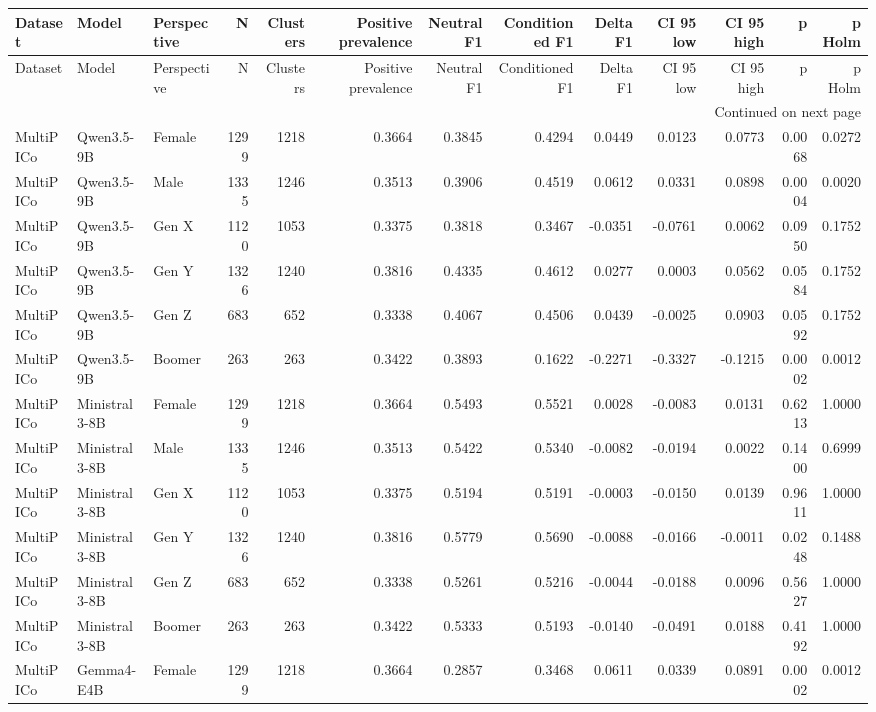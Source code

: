 \begin{longtable}{lllrrrrrrrrrr}
\toprule
Dataset & Model & Perspective & N & Clusters & Positive prevalence & Neutral F1 & Conditioned F1 & Delta F1 & CI 95 low & CI 95 high & p & p Holm \\
\midrule
\endfirsthead
\toprule
Dataset & Model & Perspective & N & Clusters & Positive prevalence & Neutral F1 & Conditioned F1 & Delta F1 & CI 95 low & CI 95 high & p & p Holm \\
\midrule
\endhead
\midrule
\multicolumn{13}{r}{Continued on next page} \\
\midrule
\endfoot
\bottomrule
\endlastfoot
MultiPICo & Qwen3.5-9B & Female & 1299 & 1218 & 0.3664 & 0.3845 & 0.4294 & 0.0449 & 0.0123 & 0.0773 & 0.0068 & 0.0272 \\
MultiPICo & Qwen3.5-9B & Male & 1335 & 1246 & 0.3513 & 0.3906 & 0.4519 & 0.0612 & 0.0331 & 0.0898 & 0.0004 & 0.0020 \\
MultiPICo & Qwen3.5-9B & Gen X & 1120 & 1053 & 0.3375 & 0.3818 & 0.3467 & -0.0351 & -0.0761 & 0.0062 & 0.0950 & 0.1752 \\
MultiPICo & Qwen3.5-9B & Gen Y & 1326 & 1240 & 0.3816 & 0.4335 & 0.4612 & 0.0277 & 0.0003 & 0.0562 & 0.0584 & 0.1752 \\
MultiPICo & Qwen3.5-9B & Gen Z & 683 & 652 & 0.3338 & 0.4067 & 0.4506 & 0.0439 & -0.0025 & 0.0903 & 0.0592 & 0.1752 \\
MultiPICo & Qwen3.5-9B & Boomer & 263 & 263 & 0.3422 & 0.3893 & 0.1622 & -0.2271 & -0.3327 & -0.1215 & 0.0002 & 0.0012 \\
MultiPICo & Ministral3-8B & Female & 1299 & 1218 & 0.3664 & 0.5493 & 0.5521 & 0.0028 & -0.0083 & 0.0131 & 0.6213 & 1.0000 \\
MultiPICo & Ministral3-8B & Male & 1335 & 1246 & 0.3513 & 0.5422 & 0.5340 & -0.0082 & -0.0194 & 0.0022 & 0.1400 & 0.6999 \\
MultiPICo & Ministral3-8B & Gen X & 1120 & 1053 & 0.3375 & 0.5194 & 0.5191 & -0.0003 & -0.0150 & 0.0139 & 0.9611 & 1.0000 \\
MultiPICo & Ministral3-8B & Gen Y & 1326 & 1240 & 0.3816 & 0.5779 & 0.5690 & -0.0088 & -0.0166 & -0.0011 & 0.0248 & 0.1488 \\
MultiPICo & Ministral3-8B & Gen Z & 683 & 652 & 0.3338 & 0.5261 & 0.5216 & -0.0044 & -0.0188 & 0.0096 & 0.5627 & 1.0000 \\
MultiPICo & Ministral3-8B & Boomer & 263 & 263 & 0.3422 & 0.5333 & 0.5193 & -0.0140 & -0.0491 & 0.0188 & 0.4192 & 1.0000 \\
MultiPICo & Gemma4-E4B & Female & 1299 & 1218 & 0.3664 & 0.2857 & 0.3468 & 0.0611 & 0.0339 & 0.0891 & 0.0002 & 0.0012 \\

\end{longtable}
